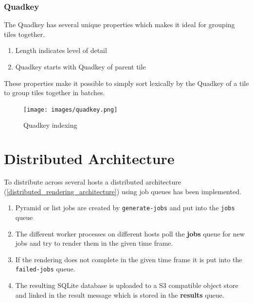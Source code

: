 \subsubsection*{Quadkey}

\noindent\begin{minipage}[t]{0.48\linewidth}
    \vspace{0pt}
    The Quadkey has several unique properties which makes it ideal for grouping tiles together.
    \begin{enumerate}  
        \item Length indicates level of detail
        \item Quadkey starts with Quadkey of parent tile
    \end{enumerate}
    
    These properties make it possible to simply sort lexically by the Quadkey of a tile to group tiles together in batches.
\end{minipage}
\hfill
\begin{minipage}[t]{0.48\linewidth}
    \vspace{-20pt}
    \begin{figure}[H]
      \centering
      \texttt{[image: images/quadkey.png]}
      \caption{Quadkey indexing}
    \end{figure}
    
    
\end{minipage}


\section{Distributed Architecture}\label{distributed_architecture}

To distribute across several hosts a distributed architecture (\autoref{distributed_rendering_architecture}) using job queues has been implemented.

\begin{enumerate}  
    \item Pyramid or list jobs are created by \texttt{generate-jobs} and put into the \texttt{jobs} queue
    \item The different worker processes on different hosts poll the \textbf{jobs} queue for new jobs and try to render them in the given time frame.
    \item If the rendering does not complete in the given time frame it is put into the \texttt{failed-jobs} queue.
    \item The resulting SQLite database is uploaded to a S3 compatible object store and linked in the result message which is stored in the \textbf{results} queue.
\end{enumerate}


